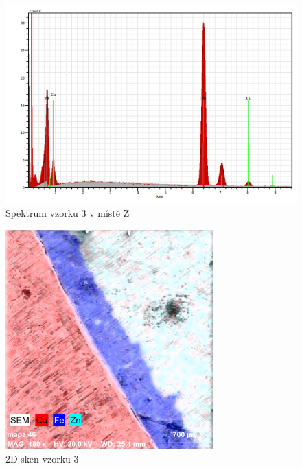 \begin{figure}[htbp]
\centering
\includegraphics[width=12cm]{graficos/3/Zsp.png}
\caption{Spektrum vzorku 3 v místě Z}
\label{o:vz3_Z}
\end{figure}

\begin{figure}[htbp]
\centering
\includegraphics[width=8cm]{graficos/3/2D.png}
\caption{2D sken vzorku 3}
\label{o:vz3_2D}
\end{figure}